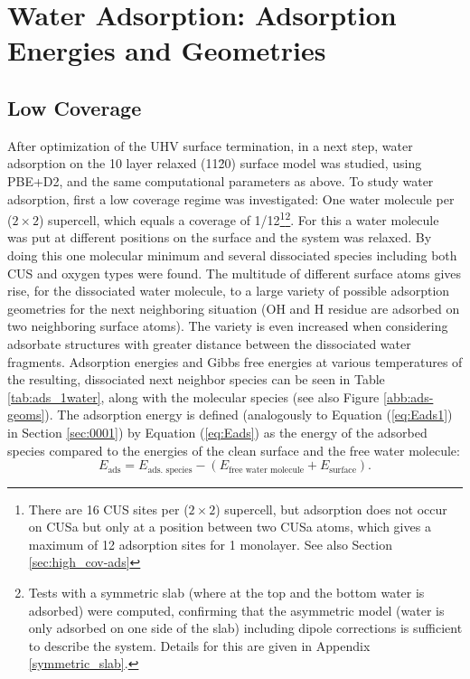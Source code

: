 \documentclass[11pt,DIV=13,BCOR=5mm,a4paper,headinclude]{scrbook}
\begin{document}
\section{Water Adsorption: Adsorption Energies and Geometries}\label{structure_search11-20}
\subsection{Low Coverage}
After optimization of the UHV surface termination, in a next step, water adsorption on the 10 layer relaxed (11\=20) surface model was studied, using PBE+D2, and the same computational parameters as above.
To study water adsorption, first a low coverage regime was investigated: One water molecule per ($2\times 2$) supercell, which equals a coverage of 1/12\footnote{There are 16 CUS sites per ($2\times 2$) supercell, but adsorption does not occur on CUSa but only at a position between two CUSa atoms, which gives a maximum of 12 adsorption sites for 1 monolayer. See also Section \ref{sec:high_cov-ads}}\footnote{Tests with a symmetric slab (where at the top and the bottom water is adsorbed) were computed, confirming that the asymmetric model (water is only adsorbed on one side of the slab) including dipole corrections is sufficient to describe the system.
Details for this are given in Appendix \ref{symmetric_slab}.}.
For this a water molecule was put at different positions on the surface and the system was relaxed.
By doing this one molecular minimum and several dissociated species including both CUS and oxygen types were found.
The multitude of different surface atoms gives rise, for the dissociated water molecule, to a large variety of possible adsorption geometries for the next neighboring situation (OH and H residue are adsorbed on two neighboring surface atoms).
The variety is even increased when considering adsorbate structures with greater distance between the dissociated water fragments.
Adsorption energies and Gibbs free energies at various temperatures of the resulting, dissociated next neighbor species can be seen in Table \ref{tab:ads_1water}, along with the molecular species (see also Figure \ref{abb:ads-geoms}).
The adsorption energy is defined (analogously to Equation (\ref{eq:Eads1}) in Section \ref{sec:0001}) by Equation (\ref{eq:Eads}) as the energy of the adsorbed species compared to the energies of the clean surface and the free water molecule:
\begin{equation}\label{eq:Eads}
 E_\textrm{ads}=E_\textrm{ads. species}-(E_\text{free water molecule}+E_\text{surface}).
\end{equation}
\end{document}
